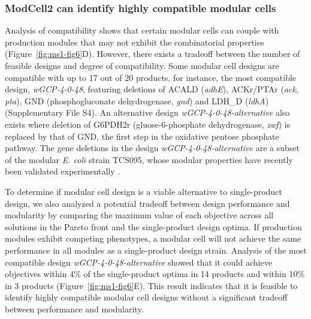 \subsubsection{ModCell2 can identify highly compatible modular cells}
Analysis of compatibility shows that certain modular cells can couple
with production modules that may not exhibit the combinatorial
properties (Figure~\ref{fig:ms1-fig6}D). However, there exists a tradeoff between the
number of feasible designs and degree of compatibility. Some modular
cell designs are compatible with up to 17 out of 20 products, for
instance, the most compatible design, \emph{wGCP-4-0-48}, featuring
deletions of ACALD (\emph{adhE}), ACKr/PTAr (\emph{ack}, \emph{pta}),
GND (phosphogluconate dehydrogenase, \emph{gnd}) and LDH\_D
(\emph{ldhA}) (Supplementary File S4). An alternative design
\emph{wGCP-4-0-48-alternative} also exists where deletion of G6PDH2r
(gluose-6-phosphate dehydrogenase, \emph{zwf}) is replaced by that of
GND, the first step in the oxidative pentose phosphate pathway. The gene
deletions in the design \emph{wGCP-4-0-48-alternative} are a subset of
the modular \emph{E. coli} strain TCS095, whose modular properties have
recently been validated experimentally \citep{wilbanks2017}.

To determine if modular cell design is a viable alternative to single-product design, we also analyzed a potential tradeoff between design performance and modularity by comparing the maximum value of each objective across all solutions in the Pareto front and the single-product design optima.
If production modules exhibit competing phenotypes, a modular cell will not achieve the same performance in all modules as a single-product design strain.
Analysis of the most compatible design \emph{wGCP-4-0-48-alternative} showed that it could achieve objectives within 4\% of the single-product optima in 14 products and within 10\% in 3 products (Figure~\ref{fig:ms1-fig6}E).
This result indicates that it is feasible to identify highly compatible modular cell designs without a significant tradeoff between performance and modularity.

